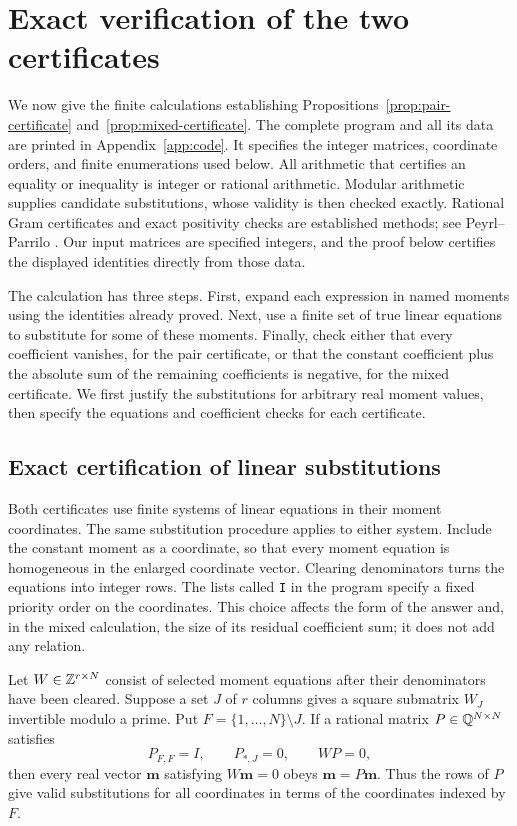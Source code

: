 \section{Exact verification of the two certificates}
\label{sec:verification}

We now give the finite calculations establishing
Propositions~\ref{prop:pair-certificate} and~\ref{prop:mixed-certificate}.
The complete program and all its data are printed in
Appendix~\ref{app:code}.  It specifies the integer
matrices, coordinate orders, and finite enumerations used below.  All
arithmetic that certifies an equality or inequality is integer or rational
arithmetic.  Modular arithmetic supplies candidate substitutions, whose
validity is then checked exactly.
Rational Gram certificates and exact positivity checks are established
methods; see Peyrl--Parrilo \cite[Section~3]{PeyrlParrilo2008}.
Our input matrices are specified integers, and the proof below certifies
the displayed identities directly from those data.

The calculation has three steps.  First, expand each expression in named
moments using the identities already proved.  Next, use a finite set of
true linear equations to substitute for some of these moments.  Finally,
check either that every coefficient vanishes, for the pair certificate, or
that the constant coefficient plus the absolute sum of the remaining
coefficients is negative, for the mixed certificate.  We first justify the
substitutions for arbitrary real moment values, then specify the equations and coefficient checks for each certificate.

\subsection{Exact certification of linear substitutions}

Both certificates use finite systems of linear equations in their moment
coordinates. The same substitution procedure applies to either system.
Include the constant moment as a coordinate, so that every moment equation is
homogeneous in the enlarged coordinate vector.  Clearing denominators
turns the equations into integer rows.  The lists called \texttt{I} in
the program specify a fixed priority order on the coordinates.  This
choice affects the form of the answer and, in the mixed calculation,
the size of its residual coefficient sum; it does not add any relation.

\begin{lemma}
\label{lem:exact-elimination}
Let $W\in\mathbb Z^{r\times N}$ consist of selected moment equations after
their denominators have been cleared.  Suppose a set $J$ of $r$ columns gives a square
submatrix $W_J$ invertible modulo a prime.  Put
$F=\{1,\ldots,N\}\setminus J$.  If a rational matrix
$P\in\mathbb Q^{N\times N}$ satisfies
\[
 P_{F,F}=I,\qquad P_{*,J}=0,\qquad WP=0,
\]
then every real vector $\mathbf m$ satisfying $W\mathbf m=0$ obeys
$\mathbf m=P\mathbf m$.  Thus the rows of $P$ give valid substitutions
for all coordinates in terms of the coordinates indexed by $F$.
\end{lemma}

